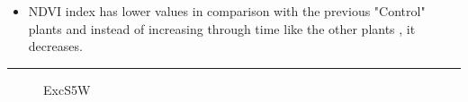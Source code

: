 \documentclass{article}
\begin{document}
{\begin{landscape}
                    \begin{itemize}
                       \item  NDVI index has lower values in comparison with the previous "Control" plants and instead of increasing through time like the other plants , it decreases.
                    \end{itemize}
                    \newpage
                    \vspace*{-3.8\baselineskip}
                    \hrule
                    \vspace*{3\baselineskip}
                    
                    \begin{figure}[h]
                        \centering
                        \qquad
                        \caption{ExcS5W}%
                        \label{fig:example}
                    \end{figure}
                    \vspace*{2\baselineskip}
                    

\end{landscape}}
\end{document}
